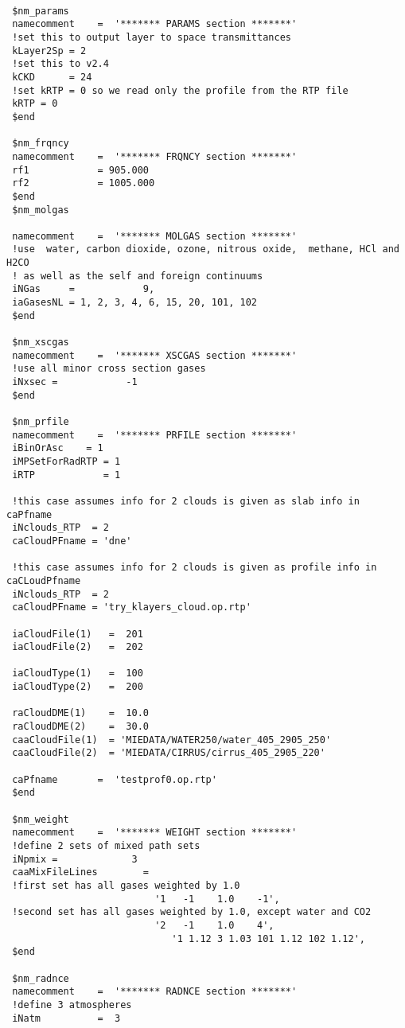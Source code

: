 \documentclass[12pt]{article}
\begin{document}
\begin{scriptsize}
\begin{verbatim}

 $nm_params
 namecomment    =  '******* PARAMS section *******'
 !set this to output layer to space transmittances
 kLayer2Sp = 2
 !set this to v2.4
 kCKD      = 24
 !set kRTP = 0 so we read only the profile from the RTP file
 kRTP = 0
 $end

 $nm_frqncy
 namecomment    =  '******* FRQNCY section *******'
 rf1            = 905.000
 rf2            = 1005.000
 $end
 $nm_molgas

 namecomment    =  '******* MOLGAS section *******'
 !use  water, carbon dioxide, ozone, nitrous oxide,  methane, HCl and H2CO 
 ! as well as the self and foreign continuums 
 iNGas     =            9,
 iaGasesNL = 1, 2, 3, 4, 6, 15, 20, 101, 102
 $end

 $nm_xscgas
 namecomment    =  '******* XSCGAS section *******'
 !use all minor cross section gases
 iNxsec =            -1
 $end

 $nm_prfile
 namecomment    =  '******* PRFILE section *******'
 iBinOrAsc    = 1
 iMPSetForRadRTP = 1
 iRTP            = 1

 !this case assumes info for 2 clouds is given as slab info in caPfname
 iNclouds_RTP  = 2
 caCloudPFname = 'dne'

 !this case assumes info for 2 clouds is given as profile info in caCLoudPfname
 iNclouds_RTP  = 2
 caCloudPFname = 'try_klayers_cloud.op.rtp'

 iaCloudFile(1)   =  201 
 iaCloudFile(2)   =  202

 iaCloudType(1)   =  100
 iaCloudType(2)   =  200

 raCloudDME(1)    =  10.0
 raCloudDME(2)    =  30.0
 caaCloudFile(1)  = 'MIEDATA/WATER250/water_405_2905_250'
 caaCloudFile(2)  = 'MIEDATA/CIRRUS/cirrus_405_2905_220'

 caPfname       =  'testprof0.op.rtp'
 $end

 $nm_weight
 namecomment    =  '******* WEIGHT section *******'
 !define 2 sets of mixed path sets
 iNpmix =             3
 caaMixFileLines        = 
 !first set has all gases weighted by 1.0
                          '1   -1    1.0    -1',
 !second set has all gases weighted by 1.0, except water and CO2
                          '2   -1    1.0    4',
                             '1 1.12 3 1.03 101 1.12 102 1.12',
 $end

 $nm_radnce
 namecomment    =  '******* RADNCE section *******'
 !define 3 atmospheres
 iNatm          =  3


\end{verbatim}
\end{scriptsize}
\end{document}
